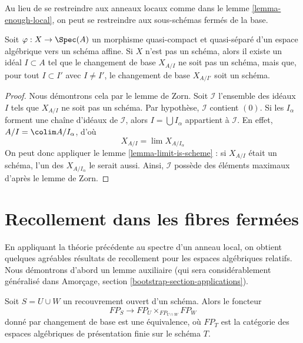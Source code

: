\noindent
Au lieu de se restreindre aux anneaux locaux comme dans le lemme \ref{lemma-enough-local},
on peut se restreindre aux sous-schémas fermés de la base.

\begin{lemma}
\label{lemma-maximal-ideal}
Soit $\varphi : X \to \Spec(A)$ un morphisme quasi-compact et quasi-séparé
d'un espace algébrique vers un schéma affine.
Si $X$ n'est pas un schéma, alors il existe un idéal $I \subset A$
tel que le changement de base $X_{A/I}$ ne soit pas un schéma, mais que,
pour tout $I \subset I'$ avec $I \not = I'$, le changement de base
$X_{A/I'}$ soit un schéma.
\end{lemma}

\begin{proof}
Nous démontrons cela par le lemme de Zorn. Soit $\mathcal{I}$ l'ensemble
des idéaux $I$ tels que $X_{A/I}$ ne soit pas un schéma. Par
hypothèse, $\mathcal{I}$ contient $(0)$. Si les $I_\alpha$ forment
une chaîne d'idéaux de $\mathcal{I}$, alors
$I = \bigcup I_\alpha$ appartient à $\mathcal{I}$. En effet,
$A/I = \colim A/I_\alpha$, d'où
$$
X_{A/I} = \lim X_{A/I_\alpha}
$$
On peut donc appliquer le lemme \ref{lemma-limit-is-scheme} : si $X_{A/I}$
était un schéma, l'un des $X_{A/I_\alpha}$ le serait aussi.
Ainsi, $\mathcal{I}$ possède des éléments maximaux d'après le lemme de Zorn.
\end{proof}






\section{Recollement dans les fibres fermées}
\label{section-change-over-closed-points}

\noindent
En appliquant la théorie précédente au spectre d'un anneau local, on obtient
quelques agréables résultats de recollement pour les espaces algébriques relatifs.
Nous démontrons d'abord un lemme auxiliaire (qui sera considérablement généralisé
dans Amorçage, section \ref{bootstrap-section-applications}).

\begin{lemma}
\label{lemma-relative-glueing}
Soit $S = U \cup W$ un recouvrement ouvert d'un schéma. Alors le foncteur
$$
FP_S \longrightarrow FP_U \times_{FP_{U \cap W}} FP_W
$$
donné par changement de base est une équivalence, où $FP_T$
est la catégorie des espaces algébriques de présentation finie sur
le schéma $T$.
\end{lemma}

